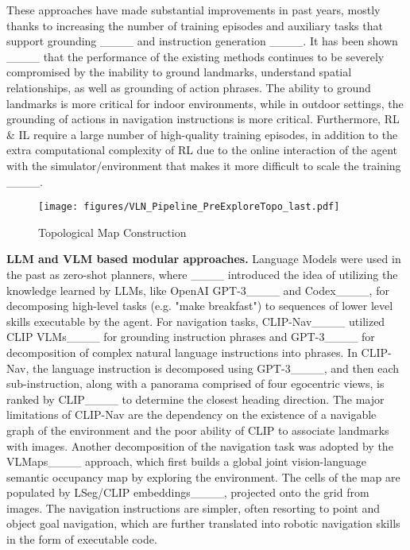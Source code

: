 These approaches have made substantial improvements in past years, mostly thanks to increasing the number of training episodes and auxiliary tasks that support grounding ____ and instruction generation ____. It has been shown ____ that the performance of the existing methods continues to be severely compromised by the inability to ground landmarks, understand spatial relationships, as well as grounding of action phrases. The ability to ground landmarks is more critical for indoor environments, while in outdoor settings, the grounding of actions in navigation instructions is more critical.
Furthermore, RL \& IL require a large number of high-quality training episodes, in addition to the extra computational complexity of RL due to the online interaction of the agent with the simulator/environment that makes it more difficult to scale the training ____.\\
%
\begin{figure*}[!h]
  \centering
  \texttt{[image: figures/VLN\_Pipeline\_PreExploreTopo\_last.pdf]}
  \caption{Topological Map Construction}
  \label{fig:vlntopo}
\end{figure*}
%
\noindent
\textbf{LLM and VLM based modular approaches.} Language Models were used in the past as zero-shot planners, where  ____ introduced the idea of utilizing the knowledge learned by LLMs, like OpenAI GPT-3____ and Codex____, for decomposing high-level tasks (e.g. "make breakfast") to sequences of lower level skills executable by the agent. For navigation tasks, CLIP-Nav____ utilized CLIP VLMs____ for grounding instruction phrases and GPT-3____ for decomposition of complex natural language instructions into phrases. In CLIP-Nav, the language instruction is decomposed using GPT-3____, and then each sub-instruction, along with a panorama comprised of four egocentric views, is ranked by CLIP____ to determine the closest heading direction. The major limitations of CLIP-Nav are the dependency on the existence of a navigable graph of the environment and the poor ability of CLIP to associate landmarks with images. 
Another decomposition of the navigation task was adopted by the VLMaps____ approach, which first builds a global joint vision-language semantic occupancy map by exploring the environment.
The cells of the map are populated by LSeg/CLIP embeddings____, projected onto the grid from images. 
The navigation instructions are simpler, often resorting to point and object goal navigation, which are further translated into robotic navigation skills in the form of executable code. 

